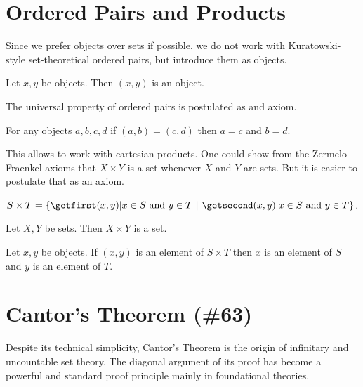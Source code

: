 \documentclass{article}
\begin{document}
\section{Ordered Pairs and Products}

Since we prefer objects over sets if possible, we do not work
with Kuratowski-style set-theoretical ordered pairs, but
introduce them as objects. 
\begin{forthel}
  \begin{lemma}
    Let $x, y$ be objects.
    Then $(x,y)$ is an object.
  \end{lemma}
\end{forthel}
%
The universal property of ordered pairs is postulated as
and axiom.
%
\begin{forthel}
  \begin{axiom}
    For any objects $a, b, c, d$ if $(a,b) = (c,d)$ then $a = c$ and $b = d$.
  \end{axiom}
\end{forthel}
This allows to work with cartesian products. One could show
from the Zermelo-Fraenkel axioms that $X \times Y$ is a set
whenever $X$ and $Y$ are sets. But it is easier to postulate
that as an axiom.
% 
\begin{forthel}
  \begin{definition}
    $S \times T = \class{(x,y) | \text{$x \in S$ and $y \in T$}}$.
  \end{definition}

  \begin{axiom}
    Let $X, Y$ be sets.
    Then $X \times Y$ is a set.
  \end{axiom}

  \begin{lemma}
    Let $x, y$ be objects.
    If $(x,y)$ is an element of $S \times T$ then $x$ is an element of $S$ and
    $y$ is an element of $T$.
  \end{lemma}

\end{forthel}



\section{Cantor's Theorem (\#63)}

Despite its technical simplicity, Cantor's Theorem is the origin of
infinitary and uncountable set theory. The diagonal argument of
its proof has become a powerful and standard proof principle mainly
in foundational theories.
\end{document}
